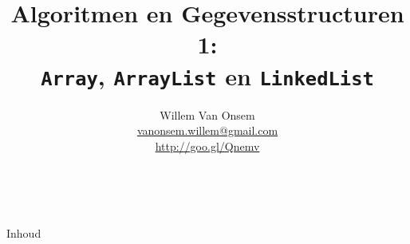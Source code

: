 \documentclass[handout]{beamer}
\title{Algoritmen en Gegevensstructuren 1:\\ \texttt{Array}, \texttt{ArrayList} en \texttt{LinkedList}}
\author{Willem Van Onsem\\ \href{mailto:vanonsem.willem@gmail.com?Subject=Presentatie\%20Algoritmen\%20en\%20Gegevensstructuren\%201}{vanonsem.willem@gmail.com} \\ \url{http://goo.gl/Qnemv}}
\theoremstyle{remark}
\begin{document}
\begin{frame}
\maketitle
\vfill
\begin{center}\\[2.5ex]{\tiny\CcNote{\CcLongnameByNcSa}}\vspace*{-2.5ex}
\end{center}
\end{frame}
\begin{frame}[plain]{Inhoud}
\begin{multicols}{2}
\tableofcontents
\end{multicols}
\end{frame}


%
%
\end{document}
